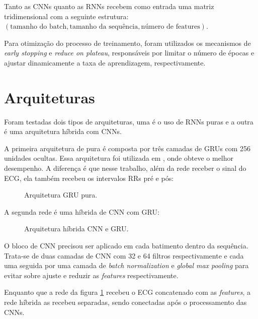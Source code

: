 Tanto as CNNs quanto as RNNs recebem como entrada uma matriz tridimensional com a seguinte estrutura: $(\text{tamanho do batch}, \text{tamanho da sequência}, \text{número de features})$.

Para otimização do processo de treinamento, foram utilizados os mecanismos de \textit{early stopping} e \textit{reduce on plateau}, responsáveis por limitar o número de épocas e ajustar dinamicamente a taxa de aprendizagem, respectivamente.

\section{Arquiteturas}
\label{sec:modelos}

Foram testadas dois tipos de arquiteturas, uma é o uso de RNNs puras e a outra é uma arquitetura híbrida com CNNs. 

A primeira arquitetura de pura é composta por três camadas de GRUs com 256 unidades ocultas. Essa arquitetura foi utilizada em , onde obteve o melhor desempenho. 
A diferença é que nesse trabalho, além da rede receber o sinal do ECG, ela também recebeu os intervalos RRs pré e pós:


\begin{figure}[H]
  \centering
  \caption{Arquitetura GRU pura.}
  \label{fig:gru_pura}
\end{figure}

A segunda rede é uma híbrida de CNN com GRU:

\begin{figure}[H]
  \centering
  \caption{Arquitetura híbrida CNN e GRU.}
  \label{fig:cnn_gru}
\end{figure}

O bloco de CNN precisou ser aplicado em cada batimento dentro da sequência. Trata-se de duas camadas de CNN com 32 e 64 filtros respectivamente e cada 
uma seguida por uma camada de \textit{batch normalization} e \textit{global max pooling} para evitar sobre ajuste e reduzir as \textit{features} respectivamente.

Enquanto que a rede da figura \ref{fig:gru_pura} recebeu o ECG concatenado com as \textit{features}, a rede híbrida as recebeu separadas, sendo conectadas após o processamento
das CNNs.
